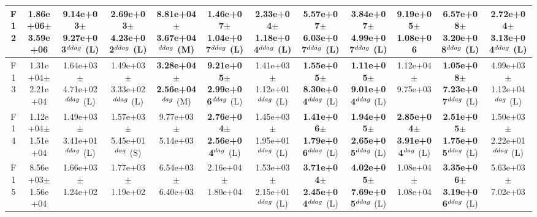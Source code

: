 \begin{table}[!t]
\begin{tabular}{c|ccccccccccc}
F12  & 1.86e+06$\pm$3.59e+06  & 9.14e+03$\pm$9.27e+03$^{\\ddag}$ (L)  & 2.69e+03$\pm$4.23e+02$^{\\ddag}$ (L)  & 8.81e+04$\pm$3.67e+04$^{\\ddag}$ (M)  & \textbf{1.46e+07$\pm$1.04e+07}$^{\\ddag}$ (L)  & 2.33e+04$\pm$1.18e+04$^{\\ddag}$ (L)  & \textbf{5.57e+07$\pm$6.03e+07}$^{\\ddag}$ (L)  & \textbf{3.84e+07$\pm$4.99e+07}$^{\\ddag}$ (L)  & 9.19e+05$\pm$1.08e+06   & \textbf{6.57e+08$\pm$3.20e+08}$^{\\ddag}$ (L)  & 2.72e+04$\pm$3.13e+04$^{\\ddag}$ (L) \\ \hline
F13  & 1.31e+04$\pm$2.21e+04  & 1.64e+03$\pm$4.71e+02$^{\\ddag}$ (L)  & 1.49e+03$\pm$3.33e+02$^{\\ddag}$ (L)  & \textbf{3.28e+04$\pm$2.56e+04}$^{\\dag}$ (M)  & \textbf{9.21e+05$\pm$2.99e+06}$^{\\ddag}$ (L)  & 1.41e+03$\pm$1.12e+01$^{\\ddag}$ (L)  & \textbf{1.55e+05$\pm$8.30e+04}$^{\\ddag}$ (L)  & \textbf{1.11e+05$\pm$9.01e+04}$^{\\ddag}$ (L)  & 1.12e+04$\pm$9.75e+03   & \textbf{1.05e+08$\pm$7.23e+07}$^{\\ddag}$ (L)  & 4.99e+03$\pm$1.12e+04$^{\\dag}$ (L) \\ \hline
F14  & 1.12e+04$\pm$1.51e+04  & 1.49e+03$\pm$3.41e+01$^{\\ddag}$ (L)  & 1.57e+03$\pm$5.45e+01$^{\\dag}$ (S)  & 9.77e+03$\pm$5.14e+03   & \textbf{2.76e+04$\pm$2.56e+04}$^{\\dag}$ (L)  & 1.45e+03$\pm$1.95e+01$^{\\ddag}$ (L)  & \textbf{1.41e+06$\pm$1.79e+06}$^{\\ddag}$ (L)  & \textbf{1.94e+05$\pm$2.65e+05}$^{\\ddag}$ (L)  & \textbf{2.85e+04$\pm$3.91e+04}$^{\\dag}$ (L)  & \textbf{2.51e+05$\pm$1.75e+05}$^{\\ddag}$ (L)  & 1.50e+03$\pm$2.22e+01$^{\\ddag}$ (L) \\ \hline
F15  & 8.56e+03$\pm$1.56e+04  & 1.66e+03$\pm$1.24e+02   & 1.77e+03$\pm$1.19e+02   & 6.54e+03$\pm$6.40e+03   & 2.16e+04$\pm$1.80e+04   & 1.53e+03$\pm$2.15e+01$^{\\ddag}$ (L)  & \textbf{3.71e+04$\pm$2.45e+04}$^{\\ddag}$ (L)  & \textbf{4.02e+05$\pm$7.69e+05}$^{\\ddag}$ (L)  & 1.08e+04$\pm$1.08e+04   & \textbf{3.35e+06$\pm$3.19e+06}$^{\\ddag}$ (L)  & 5.63e+03$\pm$7.02e+03  \\ \hline

\end{tabular}
\end{table}

